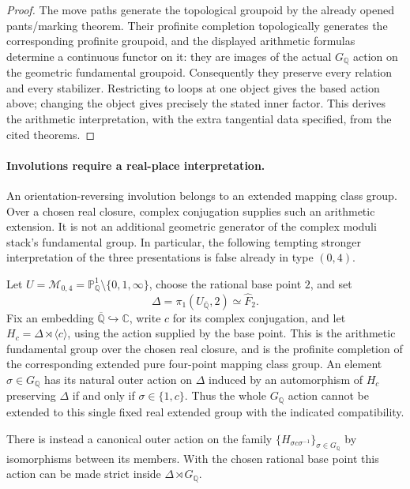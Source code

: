 \begin{proof}
The move paths generate the topological groupoid by the already
opened pants/marking theorem. Their profinite completion topologically generates
the corresponding profinite groupoid, and the displayed arithmetic
formulas determine a continuous functor on it: they are images of the
actual $G_{\mathbb Q}$ action on the geometric fundamental groupoid.
Consequently they preserve every relation and every stabilizer.
Restricting to loops at one object gives the based action above;
changing the object gives precisely the stated inner factor. This
derives the arithmetic interpretation, with the extra tangential
data specified, from the cited theorems.
\end{proof}

\paragraph{Involutions require a real-place interpretation.}
An orientation-reversing involution belongs to an extended mapping
class group. Over a chosen real closure, complex conjugation supplies
such an arithmetic extension. It is not an additional geometric
generator of the complex moduli stack's fundamental group. In
particular, the following tempting stronger interpretation of the
three presentations is false already in type $(0,4)$.

\begin{proposition}
\label{A:real-Galois-obstruction}
Let $U=\mathcal M_{0,4}=\mathbb P^1_{\mathbb Q}\setminus
\{0,1,\infty\}$, choose the rational base point $2$, and set
\[
 \Delta=\pi_1(U_{\overline{\mathbb Q}},2)\simeq\widehat F_2.
\]
Fix an embedding $\overline{\mathbb Q}\hookrightarrow\mathbb C$,
write $c$ for its complex conjugation, and let
$H_c=\Delta\rtimes\langle c\rangle$, using the action supplied by the
base point. This is the arithmetic fundamental group over the chosen
real closure, and is the profinite completion of the corresponding
extended pure four-point mapping class group. An element
$\sigma\in G_{\mathbb Q}$ has its natural outer action on $\Delta$
induced by an automorphism of $H_c$ preserving $\Delta$ if and only if
$\sigma\in\{1,c\}$. Thus the whole $G_{\mathbb Q}$ action cannot be
extended to this single fixed real extended group with the indicated
compatibility.

There is instead a canonical outer action on the family
$\{H_{\sigma c\sigma^{-1}}\}_{\sigma\in G_{\mathbb Q}}$ by
isomorphisms between its members. With the chosen rational base point
this action can be made strict inside
$\Delta\rtimes G_{\mathbb Q}$.
\end{proposition}


